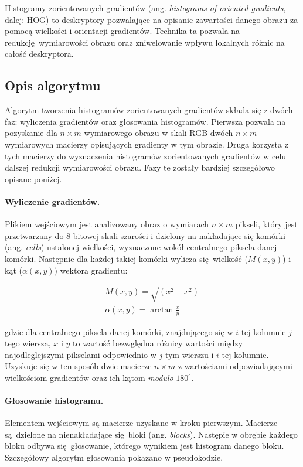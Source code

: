 \documentclass[12pt,a4paper,leqno,oneside,titlepage]{book}
\begin{document}
Histogramy zorientowanych gradientów (ang. \textit{histograms of oriented gradients}, dalej: HOG) to deskryptory pozwalające na opisanie zawartości danego obrazu za pomocą wielkości i orientacji gradientów. Technika ta pozwala na redukcję wymiarowości obrazu oraz zniwelowanie wpływu lokalnych różnic na całość deskryptora\cite{DalalTriggs05Hog}.

\subsection{Opis algorytmu}
Algorytm tworzenia histogramów zorientowanych gradientów składa się z dwóch faz: wyliczenia gradientów oraz głosowania histogramów. Pierwsza pozwala na pozyskanie dla $n\times m$-wymiarowego obrazu w skali RGB dwóch $n\times m$-wymiarowych macierzy opisujących gradienty w tym obrazie. Druga korzysta z tych macierzy do wyznaczenia histogramów zorientowanych gradientów w celu dalszej redukcji wymiarowości obrazu. Fazy te zostały bardziej szczegółowo opisane poniżej.

\paragraph{Wyliczenie gradientów.}
Plikiem wejściowym jest analizowany obraz o wymiarach $n\times m$ pikseli, który jest przetwarzany do 8-bitowej skali szarości i dzielony na nakładające się komórki (ang. \textit{cells}) ustalonej wielkości, wyznaczone wokół centralnego piksela danej komórki. Następnie dla każdej takiej komórki wylicza się wielkość ($M(x,y)$) i kąt ($\alpha(x,y)$) wektora gradientu:

\begin{align}
M(x,y) = \sqrt{\left( x^{2}+x^{2}\right)} \\
\alpha(x,y) = \arctan{\frac{x}{y}}
\end{align}

gdzie dla centralnego piksela danej komórki, znajdującego się w $i$-tej kolumnie $j$-tego wiersza, $x$ i $y$ to wartość bezwględna różnicy wartości między najodleglejszymi pikselami odpowiednio w $j$-tym wierszu i $i$-tej kolumnie. Uzyskuje się w ten sposób dwie macierze $n\times m$ z wartościami odpowiadającymi wielkościom gradientów oraz ich kątom \textit{modulo} $180^\circ$\cite{dpi2008}.

\paragraph{Głosowanie histogramu.}
Elementem wejściowym są macierze uzyskane w kroku pierwszym. Macierze są dzielone na nienakładające się bloki (ang. \textit{blocks}). Następie w obrębie każdego bloku odbywa się głosowanie, którego wynikiem jest histogram danego bloku. Szczegółowy algorytm głosowania pokazano w pseudokodzie.
\end{document}
